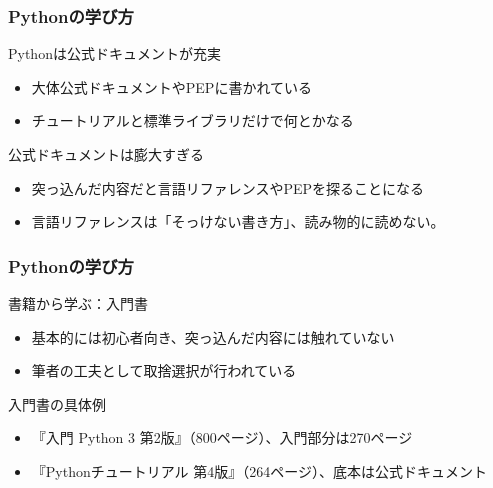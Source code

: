 \documentclass[aspectratio=169,dvipdfmx,12pt,notheorems]{beamer}
\theoremstyle{definition}
\begin{document}
\begin{frame}\frametitle{Pythonの学び方}

\begin{block}{Pythonは公式ドキュメントが充実}
\begin{itemize}
\item 大体公式ドキュメントやPEPに書かれている
\item チュートリアルと標準ライブラリだけで何とかなる
\end{itemize}
\end{block}

\begin{alertblock}{公式ドキュメントは膨大すぎる}
\begin{itemize}
\item 突っ込んだ内容だと言語リファレンスやPEPを探ることになる
\item 言語リファレンスは「そっけない書き方」、読み物的に読めない。
\end{itemize}
\end{alertblock}

\end{frame}

\begin{frame}\frametitle{Pythonの学び方}

\begin{block}{書籍から学ぶ：入門書}
\begin{itemize}
\item 基本的には初心者向き、突っ込んだ内容には触れていない
\item 筆者の工夫として取捨選択が行われている
\end{itemize}
\end{block}

\begin{exampleblock}{入門書の具体例}
\begin{itemize}
\item 『入門 Python 3 第2版』（800ページ）、入門部分は270ページ
\item 『Pythonチュートリアル 第4版』（264ページ）、底本は公式ドキュメント
\end{itemize}
\end{exampleblock}

\end{frame}
\end{document}
